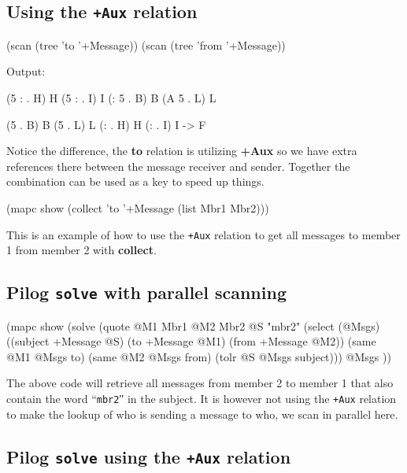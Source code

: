 \subsection{Using the \texttt{+Aux} relation}
\label{sec:pilog-solve-using-the-+aux}

\begin{wideverbatim}
(scan (tree 'to '+Message))
(scan (tree 'from '+Message))
\end{wideverbatim}

Output:

\begin{wideverbatim}
({5} {:} . {H}) {H}
({5} {:} . {I}) {I}
({:} {5} . {B}) {B}
({A} {5} . {L}) {L}

({5} . {B}) {B}
({5} . {L}) {L}
({:} . {H}) {H}
({:} . {I}) {I}
-> {F}
\end{wideverbatim}

Notice the difference, the \textbf{to} relation is utilizing \textbf{+Aux} so we have
extra references there between the message receiver and sender. Together
the combination can be used as a key to speed up things.


\begin{wideverbatim}
(mapc show (collect 'to '+Message (list Mbr1 Mbr2)))
\end{wideverbatim}

This is an example of how to use the \texttt{+Aux} relation to get all messages
to member 1 from member 2 with \textbf{collect}.


\subsection{Pilog \texttt{solve} with parallel scanning}
\label{sec:pilog-solve-using-the-+aux}

\begin{wideverbatim}
(mapc show
   (solve  
     (quote @M1 Mbr1 @M2 Mbr2 @S "mbr2" 
        (select (@Msgs) 
           ((subject +Message @S) (to +Message @M1) (from +Message @M2))
           (same @M1 @Msgs to)
           (same @M2 @Msgs from)
           (tolr @S @Msgs subject)))  
     @Msgs ))
\end{wideverbatim}

The above code will retrieve all messages from member 2 to member 1
that also contain the word “\texttt{mbr2}″ in the subject. It is
however not using the \texttt{+Aux} relation to make the lookup of who
is sending a message to who, we scan in parallel here.


\subsection{Pilog \texttt{solve} using the \texttt{+Aux} relation}
\label{sec:pilog-solve-using-the-+aux}


